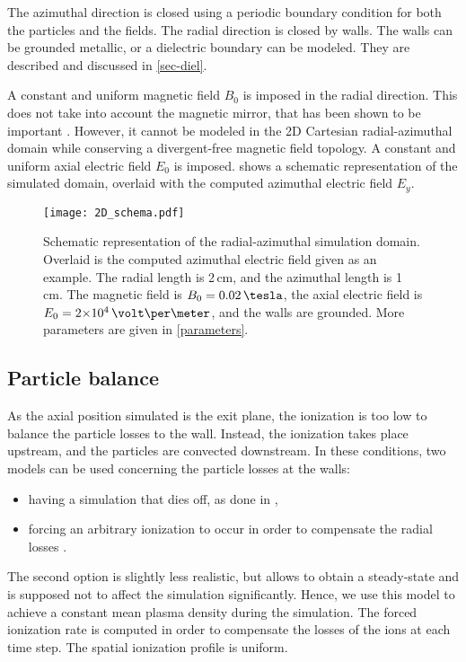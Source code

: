 The azimuthal direction is closed using a periodic boundary condition for both the particles and the fields.
The radial direction is closed by walls.
The walls can be grounded metallic, or a dielectric boundary can be modeled.
They are described and discussed in \cref{sec-diel}.


A constant and uniform magnetic field $B_0$ is imposed in the radial direction.
This does not take into account the magnetic mirror, that has been shown to be important \citep{keidar2005,yu2008a,dominguez-vazquez2018}.
However, it cannot be modeled in the \ac{2D} Cartesian radial-azimuthal domain while conserving a divergent-free magnetic field topology.
A constant and uniform axial electric field $E_0$ is imposed.
 shows a schematic representation of the simulated domain, overlaid with the computed azimuthal electric field $E_y$.

\begin{figure}[hbtp]
  \centering
  \texttt{[image: 2D\_schema.pdf]}
  \caption{Schematic representation of the radial-azimuthal simulation domain. Overlaid is the computed azimuthal electric field given as an example. The radial length is 2\,cm, and the azimuthal length is 1\,cm.
  The magnetic field is $B_0=0.02\,\tesla$, the axial electric field is $E_0=\sn{2}{4}\,\volt\per\meter$, and the walls are grounded. More parameters are given in \cref{parameters}.}
  \label{fig-2dschemat}
\end{figure}

\subsection{Particle balance}
As the axial position simulated is the exit plane, the ionization is too low to balance the particle losses to the wall.
Instead, the ionization takes place upstream, and the particles are convected downstream.
In these conditions, two models can be used concerning the particle losses at the walls\string:
\begin{itemize}
  \item having a simulation that dies off, as done in \citet{janhunen2018},
  \item forcing an arbitrary ionization to occur in order to compensate the radial losses \citep{dominguez-vazquez2018}.
\end{itemize}
The second option is slightly less realistic, but allows to obtain a steady-state and is supposed not to affect the simulation significantly.
Hence, we use this model to achieve a constant mean plasma density during the simulation.
The forced ionization rate is computed in order to compensate the losses of the ions at each time step.
The spatial ionization  profile is uniform.


